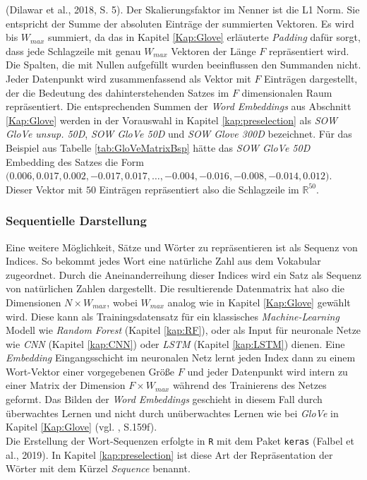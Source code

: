 \documentclass[a4paper,11pt]{article}
\begin{document}
(Dilawar et al., 2018, S. 5). Der Skalierungsfaktor im Nenner ist die L1 Norm. Sie entspricht der Summe der absoluten Einträge der summierten Vektoren. Es wird bis $W_{max}$ summiert, da das in Kapitel \ref{Kap:Glove} erläuterte \textit{Padding} dafür sorgt, dass jede Schlagzeile mit genau $W_{max}$ Vektoren der Länge $F$ repräsentiert wird. Die Spalten, die mit Nullen aufgefüllt wurden beeinflussen den Summanden nicht.
Jeder Datenpunkt wird zusammenfassend als Vektor mit $F$ Einträgen dargestellt, der die Bedeutung des dahinterstehenden Satzes im $F$ dimensionalen Raum repräsentiert. Die entsprechenden Summen der \textit{Word Embeddings} aus Abschnitt \ref{Kap:Glove} werden in der Vorauswahl in Kapitel \ref{kap:preselection} als \textit{SOW GloVe unsup. 50D}, \textit{SOW GloVe 50D} und \textit{SOW Glove 300D} bezeichnet.
Für das Beispiel aus Tabelle \ref{tab:GloVeMatrixBsp} hätte das \textit{SOW GloVe 50D} Embedding des Satzes
 die Form \\
$\textbf{(}0.006, 0.017,  0.002, -0.017,  0.017, \dots , -0.004, -0.016, -0.008, -0.014, 0.012 \textbf{)}$. Dieser Vektor mit $50$ Einträgen repräsentiert also die Schlagzeile im $\mathbb{R}^{50}$.


\subsubsection{Sequentielle Darstellung} \label{Kap:Seq}

Eine weitere Möglichkeit, Sätze und Wörter zu repräsentieren ist als Sequenz von Indices. So bekommt jedes Wort eine natürliche Zahl aus dem Vokabular zugeordnet. Durch die Aneinanderreihung dieser Indices wird ein Satz als Sequenz von natürlichen Zahlen dargestellt. Die resultierende Datenmatrix hat also die Dimensionen $N \times W_{max}$, wobei $W_{max}$ analog wie in Kapitel \ref{Kap:Glove} gewählt wird. Diese kann als Trainingsdatensatz für ein klassisches \textit{Machine-Learning} Modell wie \textit{Random Forest} (Kapitel \ref{kap:RF}), oder als Input für neuronale Netze wie \textit{CNN} (Kapitel \ref{kap:CNN}) oder \textit{LSTM} (Kapitel \ref{kap:LSTM}) dienen. Eine \textit{Embedding} Eingangsschicht im neuronalen Netz lernt jeden Index dann zu einem Wort-Vektor einer vorgegebenen Größe $F$ und jeder Datenpunkt wird intern zu einer Matrix der Dimension $F \times W_{max}$ während des Trainierens des Netzes geformt. Das Bilden der \textit{Word Embeddings} geschieht in diesem Fall durch überwachtes Lernen und nicht durch unüberwachtes Lernen wie bei \textit{GloVe} in Kapitel \ref{Kap:Glove} (vgl. \cite{keras}, S.159f).\\
Die Erstellung der Wort-Sequenzen erfolgte in \texttt{R} mit dem Paket \texttt{keras} (Falbel et al., 2019). In Kapitel \ref{kap:preselection} ist diese Art der Repräsentation der Wörter mit dem Kürzel \textit{Sequence} benannt. \\
\end{document}
